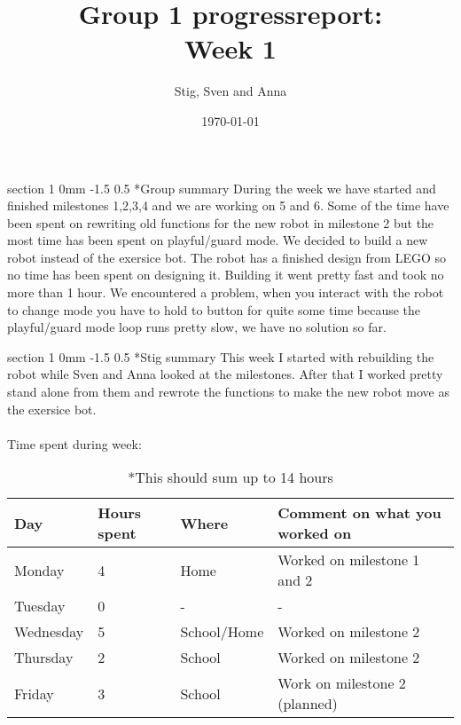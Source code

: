 \documentclass[a4paper,11pt]{article}
\makeatletter
\renewcommand{\section}{\@startsection
   {section}%
   {1}%
   {0mm}%
   {-1.5\baselineskip}%
   {0.5\baselineskip}%
   {\sffamily\bfseries\upshape\normalsize}}%
\makeatother
\begin{document}
\begin{titlepage}
\title{Group 1 progressreport:\\
Week 1}
\author{Stig, Sven and Anna}
\date{\today}
\maketitle

\vfill %

\thispagestyle{empty}

\end{titlepage}


\section*{Group summary}
During the week we have started and finished milestones 1,2,3,4 and we are working on 5 and 6. Some of the time have been spent on rewriting old functions for the new robot in milestone 2 but the most time has been spent on playful/guard mode. We decided to build a new robot instead of the exersice bot. The robot has a finished design from LEGO so no time has been spent on designing it. Building it went pretty fast and took no more than 1 hour. We encountered a problem, when you interact with the robot to change mode you have to hold to button for quite some time because the playful/guard mode loop runs pretty slow, we have no solution so far.

\section*{Stig summary}
This week I started with rebuilding the robot while Sven and Anna looked at the milestones. After that I worked pretty stand alone from them and rewrote the functions to make the new robot move as the exersice bot.
\\
\\
Time spent during week:
\begin{center}
\begin{table}[H]
    \begin{tabular}{| l | l | l | l |}
    \hline
    Day & Hours spent & Where & Comment on what you worked on \\ \hline
    Monday & 4 & Home & Worked on milestone 1 and 2 \\ \hline
    Tuesday & 0 & - & - \\ \hline
    Wednesday & 5 & School/Home & Worked on milestone 2 \\ \hline
    Thursday & 2 & School & Worked on milestone 2 \\ \hline
   	Friday & 3 & School & Work on milestone 2 (planned) \\ \hline

    \end{tabular}
    \caption*{*This should sum up to 14 hours}
    \end{table}
\end{center}
\end{document}
